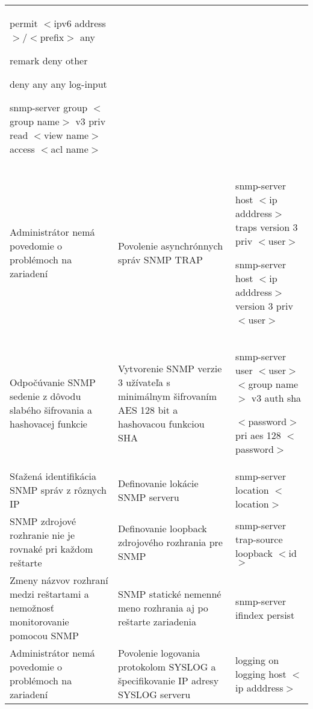\begin{longtable}[!htbp]{|L{10em}L{10em}>{\selectfont}L{34em}|}
	\hspace{0.5em}permit $<$ipv6 address$>$/$<$prefix$>$ any
	
	\hspace{0.5em}remark deny other
	
	\hspace{0.5em}deny any any log-input
	
	snmp-server group $<$group name$>$ v3 priv read $<$view name$>$  access $<$acl name$>$\\
	
	
	
	
	Administrátor nemá povedomie o problémoch na zariadení	&Povolenie asynchrónnych správ SNMP TRAP	&snmp-server host $<$ip adddress$>$ traps version 3 priv $<$user$>$
	
	snmp-server host $<$ip adddress$>$ version 3 priv $<$user$>$\\
	
	
	
	
	 Odpočúvanie SNMP sedenie z dôvodu slabého šifrovania a hashovacej  funkcie	&Vytvorenie SNMP verzie 3 užívateľa s minimálnym šifrovaním AES 128 bit a hashovacou funkciou SHA	&snmp-server user $<$user$>$ $<$group name$>$ v3 auth sha 
	
	\hspace{0.5em}$<$password$>$ pri aes 128 $<$password$>$\\
	
	
	
	
	Sťažená identifikácia SNMP správ z rôznych IP	&Definovanie lokácie SNMP serveru	&snmp-server location $<$location$>$\\
	
	
	
	
	 SNMP zdrojové rozhranie nie je rovnaké pri každom reštarte	& Definovanie loopback zdrojového rozhrania pre SNMP	&snmp-server trap-source loopback $<$id$>$\\
	
	
	
	
	Zmeny názvov rozhraní medzi reštartami a nemožnosť monitorovanie pomocou SNMP	&SNMP statické nemenné meno rozhrania aj po reštarte zariadenia	&snmp-server ifindex persist\\
	
	
	
	
	 Administrátor nemá povedomie o problémoch na zariadení	&Povolenie logovania protokolom SYSLOG a špecifikovanie IP adresy SYSLOG serveru	&logging on
	logging host $<$ip adddress$>$\\
	

\end{longtable}
